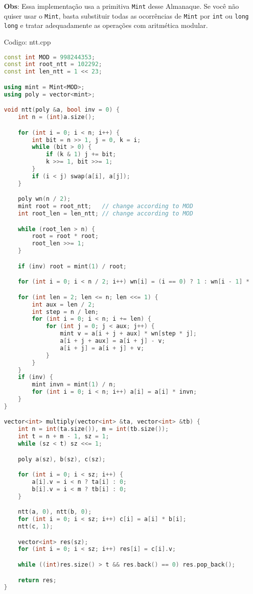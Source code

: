\documentclass[10pt, a4paper, oneside]{book}
\begin{document}
\textbf{Obs}: Essa implementação usa a primitiva \texttt{Mint} desse Almanaque. Se você não quiser usar o \texttt{Mint}, basta substituir todas as ocorrências de \texttt{Mint} por \texttt{int} ou \texttt{long long} e tratar adequadamente as operações com aritmética modular.
\hfill

Codigo: ntt.cpp

\begin{lstlisting}[language=C++]
const int MOD = 998244353;
const int root_ntt = 102292;
const int len_ntt = 1 << 23;

using mint = Mint<MOD>;
using poly = vector<mint>;

void ntt(poly &a, bool inv = 0) {
    int n = (int)a.size();

    for (int i = 0; i < n; i++) {
        int bit = n >> 1, j = 0, k = i;
        while (bit > 0) {
            if (k & 1) j += bit;
            k >>= 1, bit >>= 1;
        }
        if (i < j) swap(a[i], a[j]);
    }

    poly wn(n / 2);
    mint root = root_ntt;   // change according to MOD
    int root_len = len_ntt; // change according to MOD

    while (root_len > n) {
        root = root * root;
        root_len >>= 1;
    }

    if (inv) root = mint(1) / root;

    for (int i = 0; i < n / 2; i++) wn[i] = (i == 0) ? 1 : wn[i - 1] * root;

    for (int len = 2; len <= n; len <<= 1) {
        int aux = len / 2;
        int step = n / len;
        for (int i = 0; i < n; i += len) {
            for (int j = 0; j < aux; j++) {
                mint v = a[i + j + aux] * wn[step * j];
                a[i + j + aux] = a[i + j] - v;
                a[i + j] = a[i + j] + v;
            }
        }
    }
    if (inv) {
        mint invn = mint(1) / n;
        for (int i = 0; i < n; i++) a[i] = a[i] * invn;
    }
}

vector<int> multiply(vector<int> &ta, vector<int> &tb) {
    int n = int(ta.size()), m = int(tb.size());
    int t = n + m - 1, sz = 1;
    while (sz < t) sz <<= 1;

    poly a(sz), b(sz), c(sz);

    for (int i = 0; i < sz; i++) {
        a[i].v = i < n ? ta[i] : 0;
        b[i].v = i < m ? tb[i] : 0;
    }

    ntt(a, 0), ntt(b, 0);
    for (int i = 0; i < sz; i++) c[i] = a[i] * b[i];
    ntt(c, 1);

    vector<int> res(sz);
    for (int i = 0; i < sz; i++) res[i] = c[i].v;

    while ((int)res.size() > t && res.back() == 0) res.pop_back();

    return res;
}\end{lstlisting}
\hfill
\end{document}
